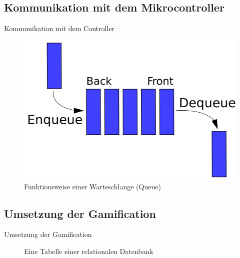 \documentclass[hyphens]{beamer}
\begin{document}
\subsection{Kommunikation mit dem Mikrocontroller}

\begin{frame}{Kommunikation mit dem Controller}
	\begin{figure}
		\includegraphics[scale=0.28]{pics/queue}
		\caption{Funktionsweise einer Warteschlange (Queue)}
	\end{figure}
\end{frame}

\subsection{Umsetzung der Gamification}

\begin{frame}{Umsetzung der Gamification}
\begin{figure}
	
	\caption{Eine Tabelle einer relationalen Datenbank}
\end{figure}
\end{frame}
\end{document}
